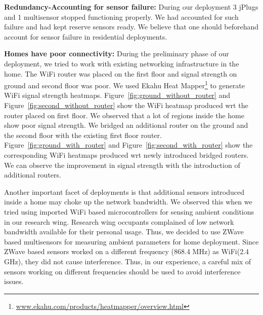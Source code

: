 \documentclass[10pt]{sensys-proc}
\newcommand{\figref}[1]{Figure~\ref{#1}}
\begin{document}
\noindent \textbf{Redundancy-Accounting for sensor failure:} During our deployment 3 jPlugs and 1 multisensor stopped functioning properly. We had accounted for such failure and had kept reserve sensors ready. We believe that one should beforehand account for sensor failure in residential deployments.

\noindent \textbf{Homes have poor connectivity:} During the preliminary phase of our deployment, we tried to work with existing networking infrastructure in the home. The WiFi router was placed on the first floor and signal strength on ground and second floor was poor. We used Ekahu Heat Mapper\footnote{\url{www.ekahu.com/products/heatmapper/overview.html}} to generate WiFi signal strength heatmaps. \figref{fig:ground_without_router} and \figref{fig:second_without_router} show the WiFi heatmap produced wrt the router placed on first floor. We observed that a lot of regions inside the home show poor signal strength. We bridged an additional router on the ground and the second floor with the existing first floor router. \figref{fig:ground_with_router} and \figref{fig:second_with_router} show the corresponding WiFi heatmaps produced wrt newly introduced bridged routers. We can observe the improvement in signal strength with the introduction of additional routers. 

\noindent Another important facet of deployments is that additional sensors introduced inside a home may choke up the network bandwidth. We observed this when we tried using imported WiFi based microcontrollers for sensing ambient conditions in our research wing. Research wing occupants complained of low network bandwidth available for their personal usage. Thus, we decided to use ZWave based multisensors for measuring ambient parameters for home deployment. Since ZWave based sensors worked on a different frequency (868.4 MHz) as WiFi(2.4 GHz), they did not cause interference. Thus, in our experience, a careful mix of sensors working on different frequencies should be used to avoid interference issues.
\end{document}
